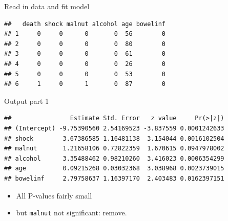 \begin{frame}[fragile]{Read in data and fit model}

 
\begin{knitrout}
\color{fgcolor}\begin{kframe}
\begin{alltt}
\hlkwb{=}\hlstd{(}\hlstd{,}
\end{alltt}
\begin{verbatim}
##   death shock malnut alcohol age bowelinf
## 1     0     0      0       0  56        0
## 2     0     0      0       0  80        0
## 3     0     0      0       0  61        0
## 4     0     0      0       0  26        0
## 5     0     0      0       0  53        0
## 6     1     0      1       0  87        0
\end{verbatim}
\begin{alltt}
\hlkwb{=}\hlopt{~}\hlopt{+}\hlopt{+}\hlopt{+}\hlopt{+}
              \hlstd{=}\hlstd{)}
\end{alltt}
\end{kframe}
\end{knitrout}
  

\end{frame}

\begin{frame}[fragile]{Output part 1}

 
\begin{knitrout}
\color{fgcolor}\begin{kframe}
\begin{alltt}
\hlopt{$}
\end{alltt}
\begin{verbatim}
##                Estimate Std. Error   z value     Pr(>|z|)
## (Intercept) -9.75390560 2.54169523 -3.837559 0.0001242633
## shock        3.67386585 1.16481138  3.154044 0.0016102504
## malnut       1.21658106 0.72822359  1.670615 0.0947978002
## alcohol      3.35488462 0.98210260  3.416023 0.0006354299
## age          0.09215268 0.03032368  3.038968 0.0023739015
## bowelinf     2.79758637 1.16397170  2.403483 0.0162397151
\end{verbatim}
\end{kframe}
\end{knitrout}

\begin{itemize}
\item All P-values fairly small
\item but \texttt{malnut} not significant: remove.
\end{itemize}


\end{frame}


